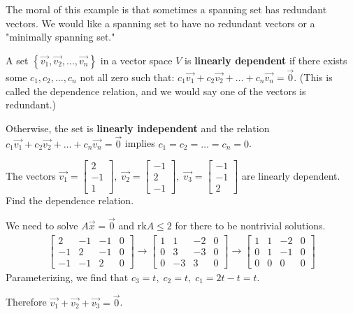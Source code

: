 \documentclass[../main.tex]{subfiles}
\begin{document}
The moral of this example is that sometimes a spanning set has redundant vectors.
We would like a spanning set to have no redundant vectors or a "minimally spanning set."

\begin{definition}
    A set \( \left\{ \vec{v_1}, \vec{v_2}, \dots, \vec{v_n} \right\} \) in a vector space \( V \) is \textbf{linearly dependent}
    if there exists some \( c_1, c_2, \dots, c_n \) not all zero such that:
    \( c_1\vec{v_1} + c_2\vec{v_2} + \dots + c_n\vec{v_n} = \vec{0} \).
    (This is called the dependence relation, and we would say one of the vectors is redundant.)

    Otherwise, the set is \textbf{linearly independent} and the relation \( c_1\vec{v_1} + c_2\vec{v_2} + \dots + c_n\vec{v_n} = \vec{0} \)
    implies \( c_1 = c_2 = \dots = c_n = 0\).
\end{definition}

\begin{example}[]
    The vectors \(\vec{v_1} = \begin{bmatrix} 2 \\ -1 \\ 1 \end{bmatrix},
    \; \vec{v_2} = \begin{bmatrix} -1 \\ 2 \\ -1 \end{bmatrix},
    \; \vec{v_3} = \begin{bmatrix} -1 \\ -1 \\ 2 \end{bmatrix} \) are linearly dependent. \\
    Find the dependence relation.

    We need to solve \( A\vec{x} = \vec{0} \) and \( \text{rk}A \leq 2 \) for there to be nontrivial solutions.
    \begin{gather*}
        \begin{bmatrix}
            2 & -1 & -1 & 0 \\
            -1 & 2 & -1 & 0 \\
            -1 & -1 & 2 & 0
        \end{bmatrix}
        \rightarrow
        \begin{bmatrix}
            1 & 1 & -2 & 0 \\
            0 & 3 & -3 & 0 \\
            0 & -3 & 3 & 0
        \end{bmatrix}
        \rightarrow
        \begin{bmatrix}
            1 & 1 & -2 & 0 \\
            0 & 1 & -1 & 0 \\
            0 & 0 & 0 & 0
        \end{bmatrix}
    \end{gather*}
    Parameterizing, we find that \( c_3 = t, \; c_2 = t, \; c_1 = 2t-t = t \).

    Therefore \( \boxed{\vec{v_1}+\vec{v_2}+\vec{v_3} = \vec{0}} \).
\end{example}
\end{document}
